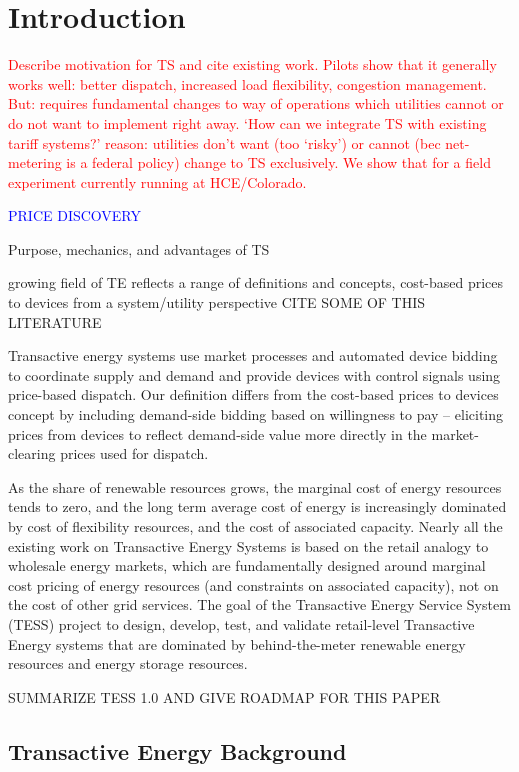 \section{Introduction}

\textcolor{red}{Describe motivation for TS and cite existing work. Pilots show that it generally works well: better dispatch, increased load flexibility, congestion management. But: requires fundamental changes to way of operations which utilities cannot or do not want to implement right away. `How can we integrate TS with existing tariff systems?' reason: utilities don't want (too `risky') or cannot (bec net-metering is a federal policy) change to TS exclusively. We show that for a field experiment currently running at HCE/Colorado.}

\textcolor{blue}{PRICE DISCOVERY}

Purpose, mechanics, and advantages of TS

growing field of TE reflects a range of definitions and concepts, cost-based prices to devices from a system/utility perspective CITE SOME OF THIS LITERATURE

Transactive energy systems use market processes and automated device bidding to coordinate supply and demand and provide devices with control signals using price-based dispatch. Our definition differs from the cost-based prices to devices concept by including demand-side bidding based on willingness to pay -- eliciting prices from devices to reflect demand-side value more directly in the market-clearing prices used for dispatch.

As the share of renewable resources grows, the marginal cost of energy resources tends to zero, and the long term average cost of energy is increasingly dominated by cost of flexibility resources, and the cost of associated capacity. Nearly all the existing work on Transactive Energy Systems is based on the retail analogy to wholesale energy markets, which are fundamentally designed around marginal cost pricing of energy resources (and constraints on associated capacity), not on the cost of other grid services. The goal of the Transactive Energy Service System (TESS) project to design, develop, test, and validate retail-level Transactive Energy systems that are dominated by behind-the-meter renewable energy resources and energy storage resources.

SUMMARIZE TESS 1.0 AND GIVE ROADMAP FOR THIS PAPER

\subsection{Transactive Energy Background} 

